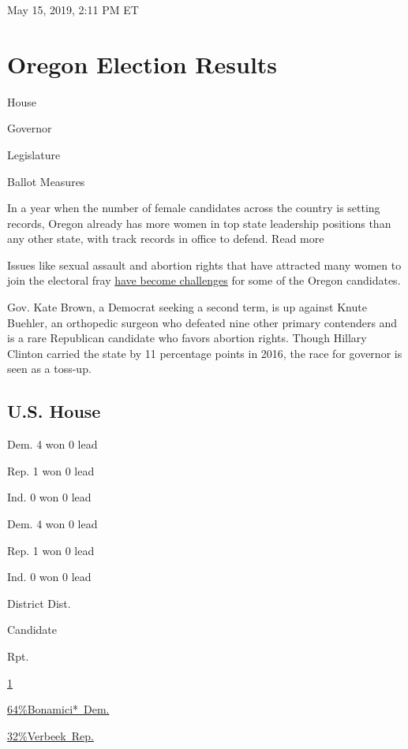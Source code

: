 May 15, 2019, 2:11 PM ET

\hypertarget{oregon-election-results}{%
\section{Oregon Election Results}\label{oregon-election-results}}

House

Governor

Legislature

Ballot Measures

In a year when the number of female candidates across the country is
setting records, Oregon already has more women in top state leadership
positions than any other state, with track records in office to defend.
Read more

Issues like sexual assault and abortion rights that have attracted many
women to join the electoral fray
\href{https://www.nytimes3xbfgragh.onion/2018/09/02/us/politics/oregon-women-politics.html}{have
become challenges} for some of the Oregon candidates.

Gov. Kate Brown, a Democrat seeking a second term, is up against Knute
Buehler, an orthopedic surgeon who defeated nine other primary
contenders and is a rare Republican candidate who favors abortion
rights. Though Hillary Clinton carried the state by 11 percentage points
in 2016, the race for governor is seen as a toss-up.

\hypertarget{us-house}{%
\subsection{U.S. House}\label{us-house}}

Dem. 4 won 0 lead

Rep. 1 won 0 lead

Ind. 0 won 0 lead

Dem. 4 won 0 lead

Rep. 1 won 0 lead

Ind. 0 won 0 lead

District Dist.

Candidate

Rpt.

\href{https://www.nytimes3xbfgragh.onion/elections/results/oregon-house-district-1}{1}

\href{https://www.nytimes3xbfgragh.onion/elections/results/oregon-house-district-1}{
64\%Bonamici*~Dem.}

\href{https://www.nytimes3xbfgragh.onion/elections/results/oregon-house-district-1}{
32\%Verbeek~Rep.}

